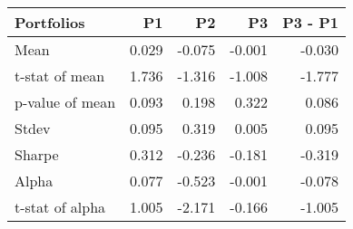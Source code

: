 \begin{tabular}{lrrrr}
\toprule
Portfolios & P1 & P2 & P3 & P3 - P1 \\
\midrule
Mean & 0.029 & -0.075 & -0.001 & -0.030 \\
t-stat of mean & 1.736 & -1.316 & -1.008 & -1.777 \\
p-value of mean & 0.093 & 0.198 & 0.322 & 0.086 \\
Stdev & 0.095 & 0.319 & 0.005 & 0.095 \\
Sharpe & 0.312 & -0.236 & -0.181 & -0.319 \\
Alpha & 0.077 & -0.523 & -0.001 & -0.078 \\
t-stat of alpha & 1.005 & -2.171 & -0.166 & -1.005 \\
\bottomrule
\end{tabular}
